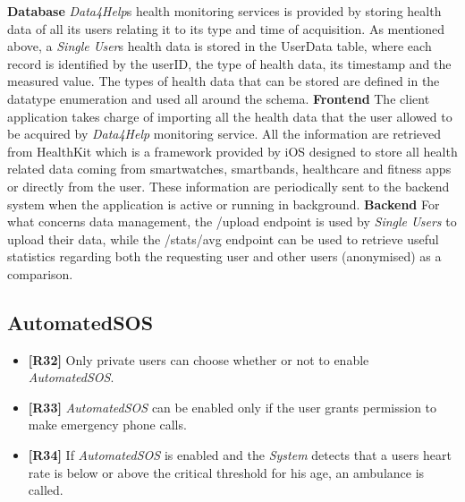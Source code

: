 \documentclass[titlepage]{article}
\begin{document}
	{\bf Database} \newline
	{\it Data4Help}\textsc{}s health monitoring services is provided by storing health data of all its users relating it to its type and time of acquisition. As mentioned above, a {\it Single User}\textsc{}s health data is stored in the UserData table, where each record is identified by the userID, the type of health data, its timestamp and the measured value. The types of health data that can be stored are defined in the datatype enumeration and used all around the schema.
	\newline
	\newline
	\noindent
	{\bf Frontend} \newline
	The client application takes charge of importing all the health data that the user allowed to be acquired by {\it Data4Help} monitoring service. All the information are retrieved from HealthKit which is a framework provided by iOS designed to store all health related data coming from smartwatches, smartbands, healthcare and fitness apps or directly from the user. These information are periodically sent to the backend system when the application is active or running in background.
	\newline
	\newline
	\noindent
	{\bf Backend} \newline
	For what concerns data management, the /upload endpoint is used by {\it Single Users} to upload their data, while the /stats/avg endpoint can be used to retrieve useful statistics regarding both the requesting user and other users (anonymised) as a comparison.
	
	
	\subsection{AutomatedSOS}
	
	\begin{itemize}
		\item {\bf [R32]} Only private users can choose whether or not to enable {\it AutomatedSOS}. 
		\item {\bf [R33]} {\it AutomatedSOS} can be enabled only if the user grants permission to make emergency phone calls. 
		\item {\bf [R34]} If {\it AutomatedSOS} is enabled and the {\it System} detects that a user\textsc{}s heart rate is below or above the critical threshold for his age, an ambulance is called. 
	\end{itemize}
	
\end{document}
